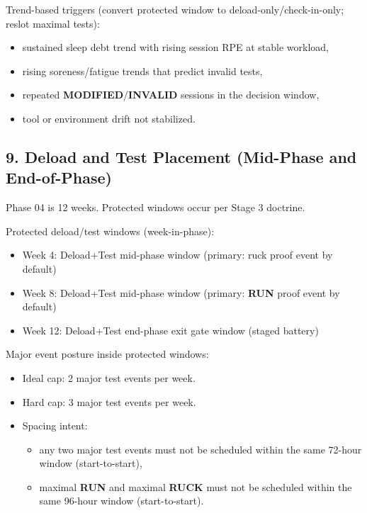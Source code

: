 \documentclass[10pt]{article}
\begin{document}
Trend-based triggers (convert protected window to deload-only/check-in-only; reslot maximal tests):

\begin{itemize}
\item sustained sleep debt trend with rising session RPE at stable workload,
\item rising soreness/fatigue trends that predict invalid tests,
\item repeated \textbf{MODIFIED}/\textbf{INVALID} sessions in the decision window,
\item tool or environment drift not stabilized.
\end{itemize}

\subsection*{9. Deload and Test Placement (Mid-Phase and End-of-Phase)}


Phase 04 is 12 weeks. Protected windows occur per Stage 3 doctrine.

Protected deload/test windows (week-in-phase):

\begin{itemize}
\item Week 4: Deload+Test mid-phase window (primary: ruck proof event by default)
\item Week 8: Deload+Test mid-phase window (primary: \textbf{RUN} proof event by default)
\item Week 12: Deload+Test end-phase exit gate window (staged battery)
\end{itemize}

Major event posture inside protected windows:

\begin{itemize}
\item Ideal cap: 2 major test events per week.
\item Hard cap: 3 major test events per week.
\item Spacing intent:
  \begin{itemize}
  \item any two major test events must not be scheduled within the same 72-hour window (start-to-start),
  \item maximal \textbf{RUN} and maximal \textbf{RUCK} must not be scheduled within the same 96-hour window (start-to-start).
  \end{itemize}
\end{itemize}
\end{document}
